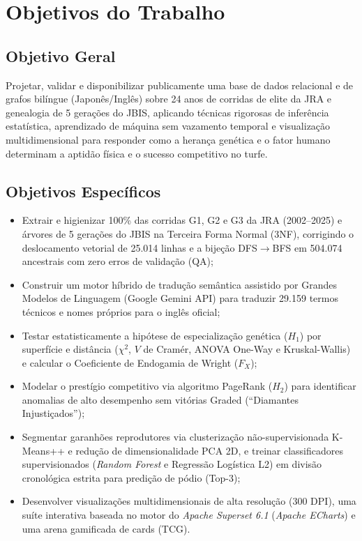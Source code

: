 \documentclass[conference]{IEEEtran}
\begin{document}
\section{Objetivos do Trabalho}
\subsection{Objetivo Geral}
Projetar, validar e disponibilizar publicamente uma base de dados relacional e de grafos bilíngue (Japonês/Inglês) sobre 24 anos de corridas de elite da JRA e genealogia de 5 gerações do JBIS, aplicando técnicas rigorosas de inferência estatística, aprendizado de máquina sem vazamento temporal e visualização multidimensional para responder como a herança genética e o fator humano determinam a aptidão física e o sucesso competitivo no turfe.

\subsection{Objetivos Específicos}
\begin{itemize}
    \item Extrair e higienizar 100\%
das corridas G1, G2 e G3 da JRA (2002--2025) e árvores de 5 gerações do JBIS na Terceira Forma Normal (3NF), corrigindo o deslocamento vetorial de 25.014 linhas e a bijeção DFS$\to$BFS em 504.074 ancestrais com zero erros de validação (QA);
    \item Construir um motor híbrido de tradução semântica assistido por Grandes Modelos de Linguagem (Google Gemini API) para traduzir 29.159 termos técnicos e nomes próprios para o inglês oficial;
    \item Testar estatisticamente a hipótese de especialização genética ($H_1$) por superfície e distância ($\chi^2$, $V$ de Cramér, ANOVA One-Way e Kruskal-Wallis) e calcular o Coeficiente de Endogamia de Wright ($F_X$);
    \item Modelar o prestígio competitivo via algoritmo PageRank ($H_2$) para identificar anomalias de alto desempenho sem vitórias Graded (``Diamantes Injustiçados'');
    \item Segmentar garanhões reprodutores via clusterização não-supervisionada K-Means++ e redução de dimensionalidade PCA 2D, e treinar classificadores supervisionados (\textit{Random Forest} e Regressão Logística L2) em divisão cronológica estrita para predição de pódio (\mbox{Top-3});
    \item Desenvolver visualizações multidimensionais de alta resolução (300 DPI), uma suíte interativa baseada no motor do \textit{Apache Superset 6.1} (\textit{Apache ECharts}) e uma arena gamificada de cards (TCG).
\end{itemize}
\end{document}
